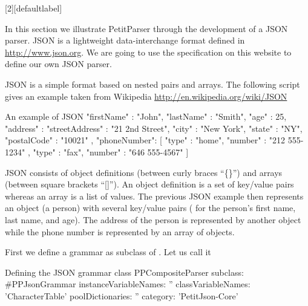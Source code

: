 \documentclass[a4paper,10pt,twoside]{book}
\begin{document}
[2][defaultlabel]{%
\renewcommand{\lstlistingname}{Script}%
}{}
\newcommand{\syntaxjsonref}[1]{\figref{syntax-json-#1}}
\newcommand{\tikzgrammarjsonfig}[2]{%
  \begin{figure}
    \centering
    \tikzgrammar{#2}
    \caption{Syntax diagram representation for the JSON #1 parser defined in \scrref{json-#1}}
\label{fig:syntax-json-#1}
\end{figure}
}

In this section we illustrate PetitParser through the development of a JSON 
parser. JSON is a lightweight data-interchange format defined in 
\url{http://www.json.org}. We are going to use the specification on this 
website to define our own JSON parser.

JSON is a simple format based on nested pairs and arrays. The
following script gives an example taken from Wikipedia
\url{http://en.wikipedia.org/wiki/JSON}

\begin{script}{An example of JSON}
{	"firstName" : "John",
	"lastName" : "Smith",
	"age" : 25,
	"address" :
  		{ 	"streetAddress" : "21 2nd Street",
			"city" : "New York",
		    "state" : "NY",
		    "postalCode" : "10021"	},
	"phoneNumber":
  		[
			{	"type" : "home",
		      	"number" : "212 555-1234"	},
			{	"type" : "fax",
				"number" : "646 555-4567"	}	]	}
\end{script}


JSON consists of object definitions (between curly braces ``\{\}'')
and arrays (between square brackets ``[]''). An object definition is a
set of key/value pairs whereas an array is a list of values. The
previous JSON example then represents an object (a person) with
several key/value pairs (\eg{} for the person's first name, last name,
and age). The address of the person is represented by another object
while the phone number is represented by an array of objects.


First we define a grammar as subclass of . Let us call it

\begin{script}{Defining the JSON grammar class}
PPCompositeParser subclass: #PPJsonGrammar
  instanceVariableNames: ''
  classVariableNames: 'CharacterTable'
  poolDictionaries: ''
  category: 'PetitJson-Core'
\end{script}
\end{document}
